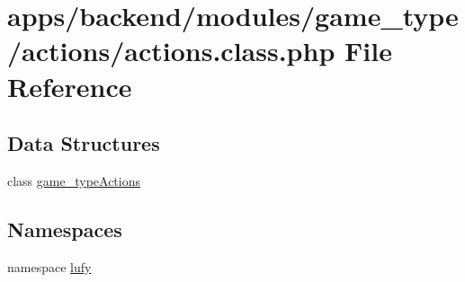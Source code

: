 \hypertarget{backend_2modules_2game__type_2actions_2actions_8class_8php}{\section{apps/backend/modules/game\-\_\-type/actions/actions.class.\-php File Reference}
\label{backend_2modules_2game__type_2actions_2actions_8class_8php}
}
\subsection*{Data Structures}
\begin{DoxyCompactItemize}
\item 
class \hyperlink{classgame__type_actions}{game\-\_\-type\-Actions}
\end{DoxyCompactItemize}
\subsection*{Namespaces}
\begin{DoxyCompactItemize}
\item 
namespace \hyperlink{namespacelufy}{lufy}
\end{DoxyCompactItemize}
